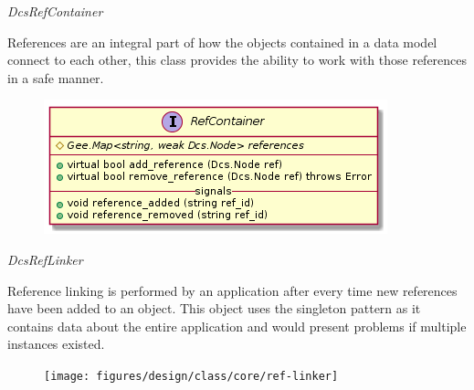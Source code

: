       \emph{DcsRefContainer}

      \vspace*{-0.75cm}
      \begin{minipage}[t]{0.5\textwidth}
        \vspace*{0.5cm}
        References are an integral part of how the objects contained in a data
        model connect to each other, this class provides the ability to work
        with those references in a safe manner.
      \end{minipage} \hfill
      \begin{minipage}[t]{0.45\textwidth}
        \begin{figure}[H]
          \includegraphics[width=\textwidth]{figures/design/class/core/ref-container}
          \label{fig:dsg-classes-ref-container}
        \end{figure}
      \end{minipage}

      \emph{DcsRefLinker}

      \vspace*{-0.75cm}
      \begin{minipage}[t]{0.5\textwidth}
        \vspace*{0.5cm}
        Reference linking is performed by an application after every time new
        references have been added to an object. This object uses the singleton
        pattern as it contains data about the entire application and would
        present problems if multiple instances existed.
      \end{minipage} \hfill
      \begin{minipage}[t]{0.45\textwidth}
        \begin{figure}[H]
          \texttt{[image: figures/design/class/core/ref-linker]}
          \label{fig:dsg-classes-ref-linker}
        \end{figure}
      \end{minipage}


